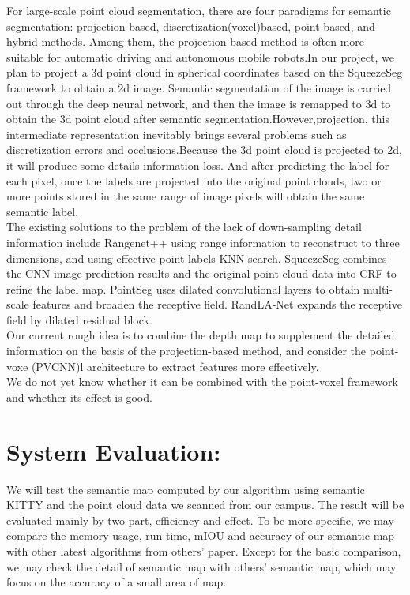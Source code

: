 \documentclass{article}
\begin{document}
\begin{normalsize}
         For large-scale point cloud segmentation, there are four paradigms for semantic segmentation: projection-based, discretization(voxel)based, point-based, and hybrid methods. Among them, the projection-based method is often more suitable for automatic driving and autonomous mobile robots.In our project, we plan to project a 3d point cloud in spherical coordinates based on the SqueezeSeg framework to obtain a 2d image. Semantic segmentation of the image is carried out through the deep neural network, and then the image is remapped to 3d to obtain the 3d point cloud after semantic segmentation.However,projection, this intermediate representation inevitably brings several problems such as discretization errors and occlusions.Because the 3d point cloud is projected to 2d, it will produce some details information loss. And after predicting the label for each pixel, once the labels are projected into the original point clouds, two or more points stored in the same range of image pixels will obtain the same semantic label. \\
         The existing solutions to the problem of the lack of down-sampling detail information include Rangenet++ using range information to reconstruct to three dimensions, and using effective point labels KNN search. SqueezeSeg combines the CNN image prediction results and the original point cloud data into CRF to refine the label map. PointSeg uses dilated convolutional layers to obtain multi-scale features and broaden the receptive field. RandLA-Net expands the receptive field by dilated residual block.\\
         Our current rough idea is to combine the depth map to supplement the detailed information on the basis of the projection-based method, and consider the point-voxe (PVCNN)l architecture to extract features more effectively.\\
         We do not yet know whether it can be combined with the point-voxel framework and whether its effect is good.

    	\section{ System Evaluation: }
        We will test the semantic map computed by our algorithm using semantic KITTY and the point cloud data we scanned from our campus. The result will be evaluated mainly by two part, efficiency and effect. To be more specific, we may compare the memory usage, run time, mIOU and accuracy of our semantic map with other latest algorithms from others' paper. Except for the basic comparison, we may check the detail of semantic map with others' semantic map, which may focus on the accuracy of a small area of map.
        

\end{normalsize}
\end{document}
